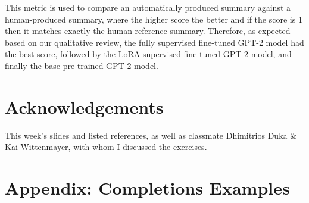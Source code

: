 \documentclass{article}
\begin{document}
This metric is used to compare an automatically produced summary against a human-produced summary, where the higher score the better and if the score is 1 then it matches exactly the human reference summary. Therefore, as expected based on our qualitative review, the fully supervised fine-tuned GPT-2 model had the best score, followed by the LoRA supervised fine-tuned GPT-2 model, and finally the base pre-trained GPT-2 model.

\clearpage

\section*{Acknowledgements}
This week's slides and listed references, as well as classmate Dhimitrios Duka \& Kai Wittenmayer, with whom I discussed the exercises.




\clearpage
\section*{Appendix: Completions Examples}
\end{document}
